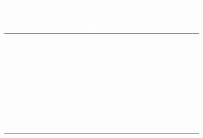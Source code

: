 \documentclass[12pt,letterpaper]{article}
\begin{document}
\begin{enumerate}
\begin{enumerate}
        \begin{table}[h]
        \centering
            \begin{tabular}{|c|c|c|c|c|c|}\hline \hline
                \multicolumn{6}{|c|}{\textcolor{white}{Auto 1}}\\\hline
                \multicolumn{3}{|l|}{\textcolor{white}{No dependiente del tiempo}} & \multicolumn{3}{|l|}{\textcolor{white}{Dependientes del tiempo}}\\\hline
                \multicolumn{3}{|c|}{\textcolor{white}{$\vec{a}[m/s^{2}]$}} & \textcolor{white}{$t[s]$} & \textcolor{white}{$\vec{x}[m]$} & \textcolor{white}{$\vec{v}[m/s]$}\\\hline
                \multicolumn{3}{|c|}{} & \textcolor{white}{2} & \textcolor{white}{7} & \textcolor{white}{7}\\\cline{4-6}
                \multicolumn{3}{|c|}{} & \textcolor{white}{4} & \textcolor{white}{28} & \textcolor{white}{14}\\\cline{4-6}
                \multicolumn{3}{|c|}{\textcolor{white}{3.5}} & \textcolor{white}{6} & \textcolor{white}{63} & \textcolor{white}{21}\\\cline{4-6}
                \multicolumn{3}{|c|}{} & \textcolor{white}{8} & \textcolor{white}{112} & \textcolor{white}{28}\\\cline{4-6}
                \multicolumn{3}{|c|}{} & \textcolor{white}{10} & \textcolor{white}{175} & \textcolor{white}{35}\\\hline \hline
            \end{tabular}\\
        \caption{\textcolor{white}{Cinemática del Auto 1}}
        \label{Cuadro 2: Cinemática del Auto 1}
        \end{table}


\end{enumerate}
\end{enumerate}
\end{document}
